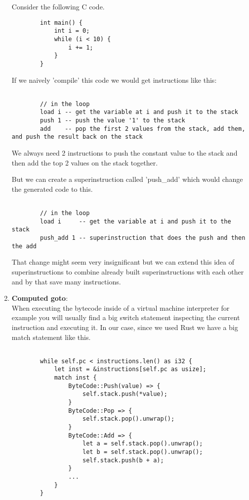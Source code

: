 \documentclass{article}
\begin{document}
\begin{enumerate}
        Consider the following C code.

        \begin{verbatim}
        int main() {
            int i = 0;
            while (i < 10) {
                i += 1;
            }
        }
        \end{verbatim}

        If we naively 'compile' this code we would get instructions like this:

        \begin{verbatim}

        // in the loop
        load i -- get the variable at i and push it to the stack
        push 1 -- push the value '1' to the stack
        add    -- pop the first 2 values from the stack, add them, and push the result back on the stack

        \end{verbatim}

        We always need 2 instructions to push the constant value to the stack and then add the top
        2 values on the stack together.

        But we can create a superinstruction called 'push\_add' which would change the generated
        code to this.

        \begin{verbatim}

        // in the loop
        load i     -- get the variable at i and push it to the stack
        push_add 1 -- superinstruction that does the push and then the add

        \end{verbatim}

        That change might seem very insignificant but we can extend this idea
        of superinstructions to combine already built superinstructions with
        each other and by that save many instructions.


    \item \textbf{Computed goto}:\\
    \label{it:goto}
        When executing the bytecode inside of a virtual machine interpreter for
        example you will usually find a big switch statement inspecting the
        current instruction and executing it. In our case, since we used Rust
        we have a big match statement like this.

        \begin{verbatim}

        while self.pc < instructions.len() as i32 {
            let inst = &instructions[self.pc as usize];
            match inst {
                ByteCode::Push(value) => {
                    self.stack.push(*value);
                }
                ByteCode::Pop => {
                    self.stack.pop().unwrap();
                }
                ByteCode::Add => {
                    let a = self.stack.pop().unwrap();
                    let b = self.stack.pop().unwrap();
                    self.stack.push(b + a);
                }
                ...
            }
        }
        \end{verbatim}


\end{enumerate}
\end{document}
